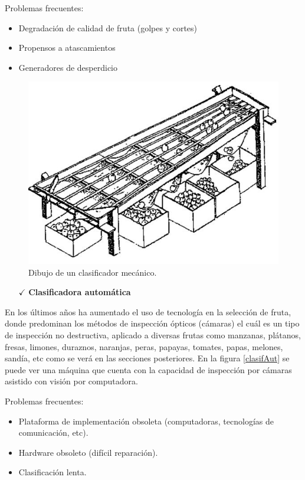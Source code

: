 \documentclass[twoside,spanish,ESP,MSc]{plantillaLabUPV}
\theoremstyle{definition}
\begin{document}
Problemas frecuentes:
\begin{itemize}
\itemsep 0em
 \item Degradación de calidad de fruta (golpes y cortes)
 \item Propensos a atascamientos
 \item Generadores de desperdicio
\end{itemize}

\begin{figure}[h]
  \centering
     \includegraphics[scale=.40]{ima/clasifMeca}
   \caption{Dibujo de un clasificador mecánico.}
   \label{clasifMeca}
\end{figure}

\begin{itemize}
	\item[$\checkmark$]{\bf Clasificadora automática}
\end{itemize}

	
	En los últimos años ha aumentado el uso de tecnología en la selección de fruta, donde predominan los métodos de inspección ópticos (cámaras) el cuál es un tipo de inspección no destructiva, aplicado a diversas frutas como manzanas, plátanos, fresas, limones, duraznos, naranjas, peras, papayas, tomates, papas, melones, sandía, etc como se verá en las secciones posteriores. En la figura \ref{clasifAut} se puede ver una máquina que cuenta con la capacidad de inspección por cámaras asistido con visión por computadora.

Problemas frecuentes:
\begin{itemize}
\itemsep 0em
 \item Plataforma de implementación obsoleta (computadoras, tecnologías de comunicación, etc).
 \item Hardware obsoleto (difícil reparación).
 \item Clasificación lenta.
\end{itemize}
	
\end{document}
